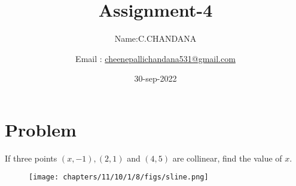 \documentclass[10pt, a4paper]{article}
\begin{document}
\title{Assignment-4}
\author{Name:C.CHANDANA\and Email :  \url{cheenepallichandana531@gmail.com}}
\date{30-sep-2022}
\maketitle



\section{Problem}
\fi
If three points $(x, -1), (2, 1)$ and $(4, 5)$ are collinear, find the value of $x$.
\\
\solution 
	\begin{figure}[H]
		\centering
 \texttt{[image: chapters/11/10/1/8/figs/sline.png]}
		\caption{}
		\label{fig:11/10/1/8}
  	\end{figure}
	\iffalse
\end{document}
